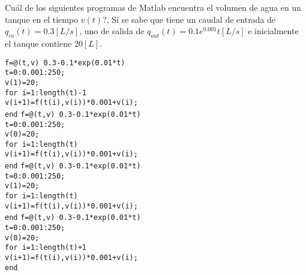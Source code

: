 \begin{pregunta}
\begin{cuerpo}
\textquestiondown Cu\'al de los siguientes programas de Matlab encuentra el volumen de agua en un tanque en el tiempo $v(t)$?, Si se sabe que tiene un caudal de entrada de $q_{in}(t)=0.3[L/s]$, uno de salida de $q_{out}(t)=0.1e^{0.001}t[L/s]$ e inicialmente el tanque contiene $20[L]$.
\end{cuerpo}

\begin{multicols}{2}
\begin{alternativas}
{
\texttt{f=@(t,v) 0.3-0.1*exp(0.01*t)}\\
\texttt{t=0:0.001:250;} \\
\texttt{v(1)=20;} \\
\texttt{for i=1:length(t)-1} \\
\texttt{v(i+1)=f(t(i),v(i))*0.001+v(i);}\\
\texttt{end}}
{
\texttt{f=@(t,v) 0.3-0.1*exp(0.01*t)}\\
\texttt{t=0:0.001:250;} \\
\texttt{v(0)=20;} \\
\texttt{for i=1:length(t)} \\
\texttt{v(i+1)=f(t(i),v(i))*0.001+v(i);}\\
\texttt{end}}
{
\texttt{f=@(t,v) 0.3-0.1*exp(0.01*t)}\\
\texttt{t=0:0.001:250;} \\
\texttt{v(1)=20;} \\
\texttt{for i=1:length(t)} \\
\texttt{v(i+1)=f(t(i),v(i))*0.001+v(i);}\\
\texttt{end}}
{
\texttt{f=@(t,v) 0.3-0.1*exp(0.01*t)}\\
\texttt{t=0:0.001:250;} \\
\texttt{v(0)=20;} \\
\texttt{for i=1:length(t)+1} \\
\texttt{v(i+1)=f(t(i),v(i))*0.001+v(i);}\\
\texttt{end}}
\end{alternativas}
\end{multicols}
\justificacion{0cm}
\end{pregunta}